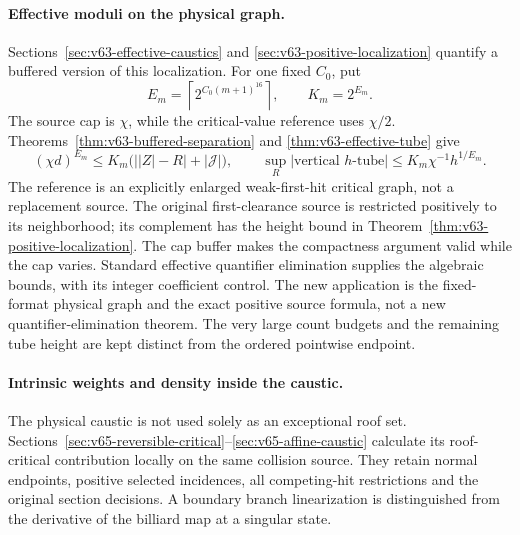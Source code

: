 \documentclass[11pt,reqno]{amsart}
\numberwithin{equation}{section}
\theoremstyle{definition}\newtheorem{definition}[theorem]{Definition}
\theoremstyle{remark}\newtheorem{remark}[theorem]{Remark}
\begin{document}
\paragraph{Effective moduli on the physical graph.}
Sections~\ref{sec:v63-effective-caustics} and
\ref{sec:v63-positive-localization} quantify a buffered version of
this localization. For one fixed $C_0$, put
\[
 E_m=\left\lceil2^{C_0(m+1)^{16}}\right\rceil,\qquad K_m=2^{E_m}.
\]
The source cap is $\chi$, while the critical-value reference uses
$\chi/2$. Theorems~\ref{thm:v63-buffered-separation} and
\ref{thm:v63-effective-tube} give
\[
 (\chi d)^{E_m}\le K_m\bigl(\bigl||Z|-R\bigr|+|\mathcal J|\bigr),
 \qquad \sup_R|\text{vertical }h\text{-tube}|
                  \le K_m\chi^{-1}h^{1/E_m}.
\]
The reference is an explicitly enlarged weak-first-hit critical graph,
not a replacement source. The original first-clearance source is
restricted positively to its neighborhood; its complement has the
height bound in Theorem~\ref{thm:v63-positive-localization}. The cap
buffer makes the compactness argument valid while the cap varies.
Standard effective quantifier elimination supplies the algebraic
bounds, with its integer coefficient control. The new application is
the fixed-format physical graph and the exact positive source formula,
not a new quantifier-elimination theorem. The very large count budgets
and the remaining tube height are kept distinct from the ordered
pointwise endpoint.


\paragraph{Intrinsic weights and density inside the caustic.}
The physical caustic is not used solely as an exceptional roof set.
Sections~\ref{sec:v65-reversible-critical}--\ref{sec:v65-affine-caustic}
calculate its roof-critical contribution locally on the same collision
source. They retain normal endpoints, positive selected incidences,
all competing-hit restrictions and the original section decisions.
A boundary branch linearization is distinguished from the derivative
of the billiard map at a singular state.
\end{document}
